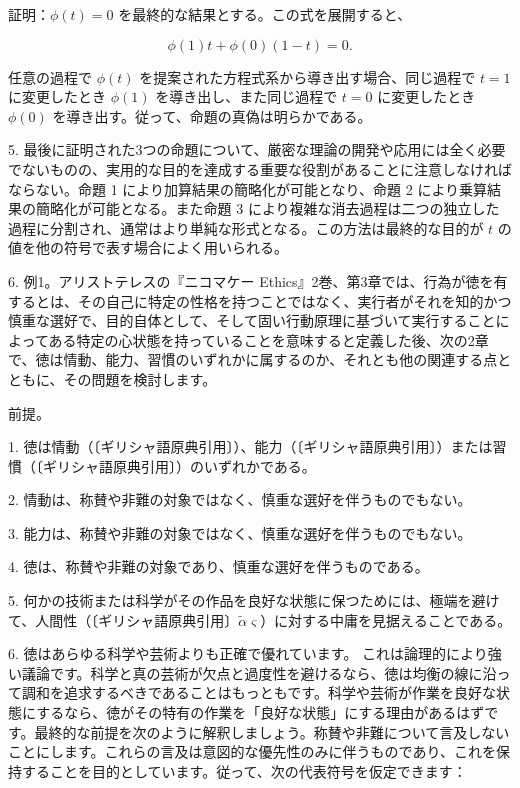 \documentclass[a4paper,11pt,openany]{ltjsbook}
\begin{document}
証明：$\phi(t) = 0$ を最終的な結果とする。この式を展開すると、

\[
\phi(1)t + \phi(0)(1-t) = 0.
\]

任意の過程で $\phi(t)$ を提案された方程式系から導き出す場合、同じ過程で $t = 1$ に変更したとき $\phi(1)$ を導き出し、また同じ過程で $t = 0$ に変更したとき $\phi(0)$ を導き出す。従って、命題の真偽は明らかである。

5. 最後に証明された3つの命題について、厳密な理論の開発や応用には全く必要でないものの、実用的な目的を達成する重要な役割があることに注意しなければならない。命題 1 により加算結果の簡略化が可能となり、命題 2 により乗算結果の簡略化が可能となる。また命題 3 により複雑な消去過程は二つの独立した過程に分割され、通常はより単純な形式となる。この方法は最終的な目的が $t$ の値を他の符号で表す場合によく用いられる。

6. 例1。アリストテレスの『ニコマケー Ethics』2巻、第3章では、行為が徳を有するとは、その自己に特定の性格を持つことではなく、実行者がそれを知的かつ慎重な選好で、目的自体として、そして固い行動原理に基づいて実行することによってある特定の心状態を持っていることを意味すると定義した後、次の2章で、徳は情動、能力、習慣のいずれかに属するのか、それとも他の関連する点とともに、その問題を検討します。

\begin{center}
前提。
\end{center}

1. 徳は情動（〔ギリシャ語原典引用〕）、能力（〔ギリシャ語原典引用〕）または習慣（〔ギリシャ語原典引用〕）のいずれかである。

2. 情動は、称賛や非難の対象ではなく、慎重な選好を伴うものでもない。

3. 能力は、称賛や非難の対象ではなく、慎重な選好を伴うものでもない。

4. 徳は、称賛や非難の対象であり、慎重な選好を伴うものである。

5. 何かの技術または科学がその作品を良好な状態に保つためには、極端を避けて、人間性（〔ギリシャ語原典引用〕$\tilde{\alpha}\varsigma$）に対する中庸を見据えることである。

6. 徳はあらゆる科学や芸術よりも正確で優れています。
これは論理的により強い議論です。科学と真の芸術が欠点と過度性を避けるなら、徳は均衡の線に沿って調和を追求するべきであることはもっともです。科学や芸術が作業を良好な状態にするなら、徳がその特有の作業を「良好な状態」にする理由があるはずです。最終的な前提を次のように解釈しましょう。称賛や非難について言及しないことにします。これらの言及は意図的な優先性のみに伴うものであり、これを保持することを目的としています。従って、次の代表符号を仮定できます：
\end{document}
